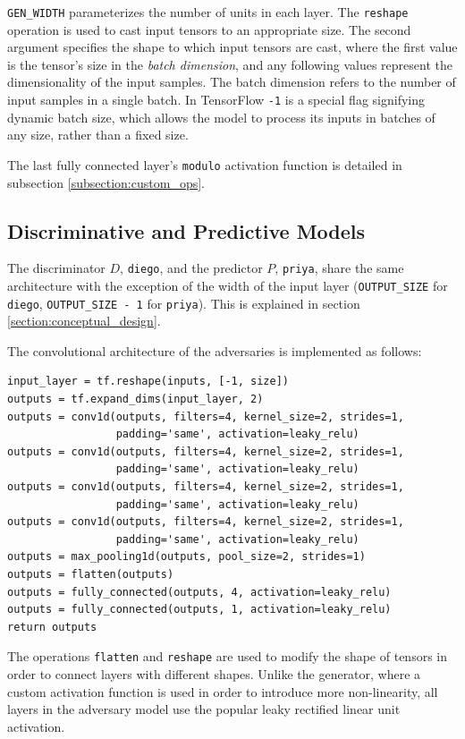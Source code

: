 \documentclass[12pt, titlepage]{report}
\theoremstyle{definition}
\begin{document}
\texttt{GEN_WIDTH} parameterizes the number of units in each layer. The \texttt{reshape} operation is used to cast input tensors to an appropriate size. The second argument specifies the shape to which input tensors are cast, where the first value is the tensor's size in the \textit{batch dimension}, and any following values represent the dimensionality of the input samples. The batch dimension refers to the number of input samples in a single batch. In TensorFlow \texttt{-1} is a special flag signifying dynamic batch size, which allows the model to process its inputs in batches of any size, rather than a fixed size.

The last fully connected layer's \texttt{modulo} activation function is detailed in subsection \ref{subsection:custom_ops}.


\subsection{Discriminative and Predictive Models}
The discriminator $D$, \texttt{diego}, and the predictor $P$, \texttt{priya}, share the same architecture with the exception of the width of the input layer (\texttt{OUTPUT_SIZE} for \texttt{diego}, \texttt{OUTPUT_SIZE - 1} for \texttt{priya}). This is explained in section \ref{section:conceptual_design}.

The convolutional architecture of the adversaries is implemented as follows:

\begin{verbatim}
input_layer = tf.reshape(inputs, [-1, size])
outputs = tf.expand_dims(input_layer, 2)
outputs = conv1d(outputs, filters=4, kernel_size=2, strides=1, 
                 padding='same', activation=leaky_relu)
outputs = conv1d(outputs, filters=4, kernel_size=2, strides=1, 
                 padding='same', activation=leaky_relu)
outputs = conv1d(outputs, filters=4, kernel_size=2, strides=1, 
                 padding='same', activation=leaky_relu)
outputs = conv1d(outputs, filters=4, kernel_size=2, strides=1, 
                 padding='same', activation=leaky_relu)
outputs = max_pooling1d(outputs, pool_size=2, strides=1)
outputs = flatten(outputs)
outputs = fully_connected(outputs, 4, activation=leaky_relu)
outputs = fully_connected(outputs, 1, activation=leaky_relu)
return outputs
\end{verbatim}

The operations \texttt{flatten} and \texttt{reshape} are used to modify the shape of tensors in order to connect layers with different shapes. Unlike the generator, where a custom activation function is used in order to introduce more non-linearity, all layers in the adversary model use the popular leaky rectified linear unit activation.
\end{document}
